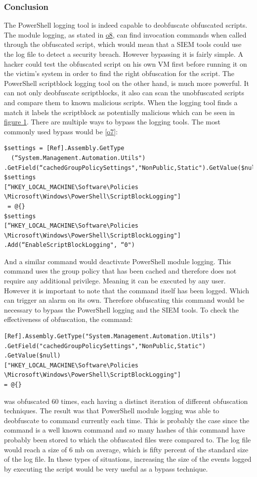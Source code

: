 \documentclass{article}%
\begin{document}
\subsubsection{Conclusion}
The PowerShell logging tool is indeed capable to deobfuscate obfuscated scripts. The module logging, as stated in \hyperlink{o8}{o8}, can find invocation commands when called through the obfuscated script, which would mean that a SIEM tools could use the log file to detect a security breach. However bypassing it is fairly simple. A hacker could test the obfuscated script on his own VM first before running it on the victim's system in order to find the right obfuscation for the script. The PowerShell scriptblock logging tool on the other hand, is much more powerful. It can not only deobfuscate scriptblocks, it also can scan the unobfuscated scripts and compare them to known malicious scripts. When the logging tool finds a match it labels the scriptblock as potentially malicious which can be seen in \hyperlink{fig1}{figure 1}.
There are multiple ways to bypass the logging tools. The most commonly used bypass would be [\hyperlink{o7}{o7}]:
\begin{verbatim}
$settings = [Ref].Assembly.GetType
  (“System.Management.Automation.Utils")
.GetField(“cachedGroupPolicySettings","NonPublic,Static").GetValue($null);
$settings
[“HKEY_LOCAL_MACHINE\Software\Policies
\Microsoft\Windows\PowerShell\ScriptBlockLogging"]
 = @{}
$settings
[“HKEY_LOCAL_MACHINE\Software\Policies
\Microsoft\Windows\PowerShell\ScriptBlockLogging"]
.Add(“EnableScriptBlockLogging", “0")
\end{verbatim}
And a similar command would deactivate PowerShell module logging. This command uses the group policy that has been cached and therefore does not require any additional privilege. Meaning it can be executed by any user. However it is important to note that the command itself has been logged. Which can trigger an alarm on its own. Therefore obfuscating this command would be necessary to bypass the PowerShell logging and the SIEM tools. To check the effectiveness of obfuscation, the command:
\begin{verbatim}
[Ref].Assembly.GetType("System.Management.Automation.Utils")
.GetField("cachedGroupPolicySettings","NonPublic,Static")
.GetValue($null)
["HKEY_LOCAL_MACHINE\Software\Policies
\Microsoft\Windows\PowerShell\ScriptBlockLogging"]
= @{}
\end{verbatim}
was obfuscated 60 times, each having a distinct iteration of different obfuscation techniques. The result was that PowerShell module logging was able to deobfuscate to command currently each time. This is probably the case since the command is a well known command and so many hashes of this command have probably been stored to which the obfuscated files were compared to. The log file would reach a size of $6$ mb on average, which is fifty percent of the standard size of the log file. In these types of situations, increasing the size of the events logged by executing the script would be very useful as a bypass technique.
\end{document}
